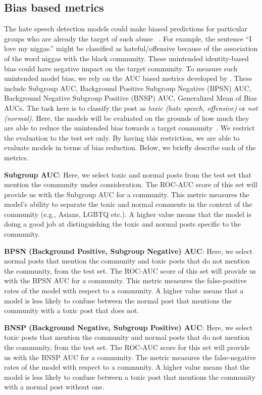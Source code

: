 \documentclass[letterpaper]{article} \usepackage{aaai21}  \usepackage{times}  \usepackage{helvet} \usepackage{courier}  \usepackage[hyphens]{url}  \usepackage{graphicx} \urlstyle{rm} \def\UrlFont{\rm}  \usepackage{natbib}  \usepackage{caption}
\begin{document}
\subsection{Bias based metrics}
The hate speech detection models could make biased predictions for particular groups who are already the target of such abuse
~\cite{sap2019risk,davidson2019racial}. For example, the sentence ``I love my niggas.'' might be classified as hateful/offensive because of the association of the word niggas with the black community. 
These unintended identity-based bias could have negative impact on the target community. To measure such unintended model bias, we rely on the AUC based metrics developed by \citet{borkan2019nuanced}. These include Subgroup AUC, Background Positive Subgroup Negative (BPSN) AUC, Background Negative Subgroup Positive (BNSP) AUC, Generalized Mean of Bias AUCs. The task here is to classify the post as \textit{toxic (hate speech, offensive)} or \textit{not (normal)}. Here, the models will be evaluated on the grounds of how much they are able to reduce the unintended bias towards a target community~\cite{borkan2019nuanced}. We restrict the evaluation to the test set only. By having this restriction, we are able to evaluate models in terms of bias reduction. Below, we briefly describe each of the metrics.

\noindent\textbf{Subgroup AUC}: Here, we select  toxic and normal posts from the test set that mention the community under consideration. The ROC-AUC score of this set will provide us with the Subgroup AUC for a community. This metric measures the model's ability to separate the toxic and normal comments in the context of the community (e.g., Asians, LGBTQ etc.). A higher value means that the model is doing a good job at distinguishing the toxic and normal posts specific to the community.

\noindent\textbf{BPSN (Background Positive, Subgroup Negative) AUC}: Here, we 
select normal posts that mention the community and  toxic posts that do not mention the community, from the test set. The ROC-AUC score of this set will provide us with the BPSN AUC for a community. This metric measures the false-positive rates of the model with respect to a community. A higher value means that a model is less likely to confuse between the normal post that mentions the community with a toxic post that does not.

\noindent\textbf{BNSP (Background Negative, Subgroup Positive) AUC}: Here, we select toxic posts that mention the community and normal posts that do not mention the community, from the test set. The ROC-AUC score for this set will provide us with the BNSP AUC for a community. The metric measures the false-negative rates of the model with respect to a community. A higher value means that the model is less likely to confuse between a toxic post that mentions the community with a normal post without one.
\end{document}
